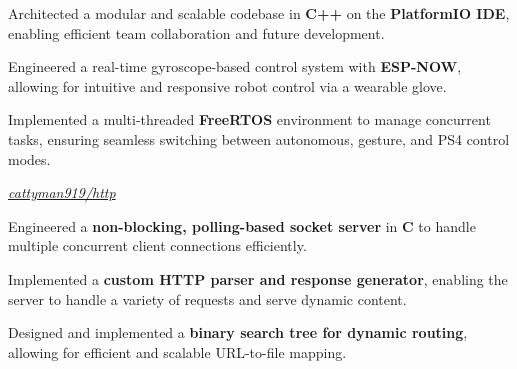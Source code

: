 \documentclass[../main.tex]{subfiles}
\begin{document}
\vspace{0.10 cm}
\begin{onecolentry}
\begin{highlights}
    \item Architected a modular and scalable codebase in \textbf{C++} on the \textbf{PlatformIO IDE}, enabling efficient team collaboration and future development.
    \item Engineered a real-time gyroscope-based control system with \textbf{ESP-NOW}, allowing for intuitive and responsive robot control via a wearable glove.
    \item Implemented a multi-threaded \textbf{FreeRTOS} environment to manage concurrent tasks, ensuring seamless switching between autonomous, gesture, and PS4 control modes.
\end{highlights}
\end{onecolentry}

\vspace{0.2 cm}

\begin{twocolentry}{
    \small
    \textit{\href{https://github.com/cattyman919/http}{cattyman919/http}}
}
\end{twocolentry}

\vspace{0.10 cm}
\begin{onecolentry}
\begin{highlights}
    \item Engineered a \textbf{non-blocking, polling-based socket server} in \textbf{C} to handle multiple concurrent client connections efficiently.
    \item Implemented a \textbf{custom HTTP parser and response generator}, enabling the server to handle a variety of requests and serve dynamic content.
    \item Designed and implemented a \textbf{binary search tree for dynamic routing}, allowing for efficient and scalable URL-to-file mapping.
\end{highlights}
\end{onecolentry}

\vspace{0.2 cm}

\begin{twocolentry}{
    \small
    \textit{\href{}{}}
}
\end{twocolentry}
\end{document}
